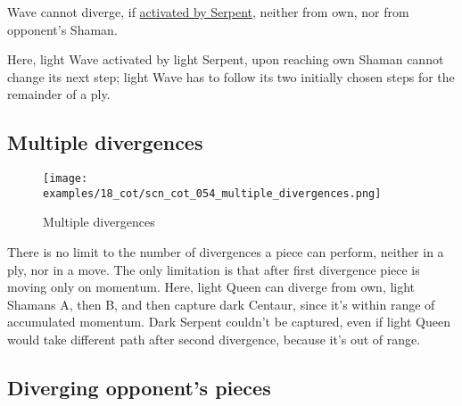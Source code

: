 \vspace*{-0.5\baselineskip}
Wave cannot diverge, if
\hyperref[fig:scn_tr_29_serpent_activating_wave]{activated by Serpent},
neither from own, nor from opponent's Shaman.

Here, light Wave activated by light Serpent, upon reaching own Shaman cannot change
its next step; light Wave has to follow its two initially chosen steps for the
remainder of a ply.

\clearpage %

\subsection*{Multiple divergences}
\label{sec:Conquest of Tlalocan/Divergence/Multiple divergences}

\vspace*{-1.4\baselineskip}
\noindent
\begin{figure}[!h]
\texttt{[image: examples/18\_cot/scn\_cot\_054\_multiple\_divergences.png]}
\vspace*{-1.3\baselineskip}
\caption{Multiple divergences}
\label{fig:scn_cot_054_multiple_divergences}
\end{figure}

\vspace*{-0.5\baselineskip}
There is no limit to the number of divergences a piece can perform, neither in a ply,
nor in a move. The only limitation is that after first divergence piece is moving
only on momentum. \newline
\indent
Here, light Queen can diverge from own, light Shamans A, then B, and then capture
dark Centaur, since it's within range of accumulated momentum. Dark Serpent couldn't
be captured, even if light Queen would take different path after second divergence,
because it's out of range.

\clearpage %

\subsection*{Diverging opponent's pieces}
\label{sec:Conquest of Tlalocan/Divergence/Diverging opponent's pieces}

